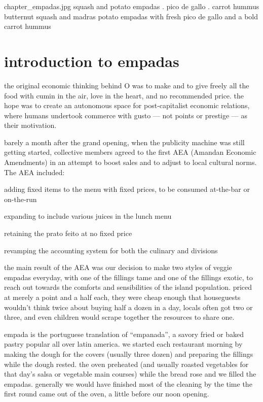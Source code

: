 \mychapter
{chapter_empadas.jpg}
{squash and potato empadas . pico de gallo . carrot hummus}
{butternut squash and madras potato empadas with fresh pico de gallo
and a bold carrot hummus}

\section{introduction to empadas}

the \gls{original economic thinking} behind O 
was to make and to give freely all the food with cumin in the air,
love in the heart, and no recommended price. the hope was to create an
autonomous space for post-capitalist economic relations, where humans
undertook commerce with gusto --- not points or prestige --- as their
motivation.

barely a month after the grand opening, when the publicity machine was
still getting started,  collective members agreed to the first
AEA (Amandan Economic Amendments) in an attempt to boost sales and to
adjust to local cultural norms. The AEA included:

\begin{ingredients}
  \item adding fixed items to the menu with fixed prices, to be
  consumed at-the-bar or on-the-run

  \item expanding to include various juices in the lunch menu

  \item retaining the \gls{prato feito} at no fixed price

  \item revamping the accounting system for both the culinary and  divisions
\end{ingredients}

the main result of the AEA was our decision to make two styles of
veggie empadas everyday, with one of the fillings tame and one of the
fillings exotic, to reach out towards the comforts and sensibilities
of the island population. priced at merely a point and a half each,
they were cheap enough that houseguests wouldn't think twice about
buying half a dozen in a day, locals often got two or three, and even
children would scrape together the resources to share one.

empada is the portuguese translation of ``empanada'', a savory fried
or baked pastry popular all over latin america. we started each
restaurant morning by making the dough for the covers (usually three
dozen) and preparing the fillings while the dough rested. the oven
preheated (and usually roasted vegetables for that day's salsa or
vegetable main courses) while the bread rose and we filled the
empadas. generally we would have finished most of the cleaning by the
time the first round came out of the oven, a little before our noon
opening.

